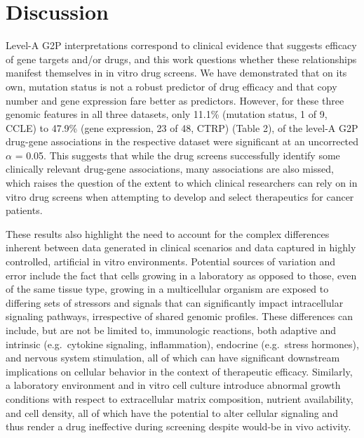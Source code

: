 \documentclass[man]{apa6}
\begin{document}
\section{Discussion}\label{discussion}

Level-A G2P interpretations correspond to clinical evidence that
suggests efficacy of gene targets and/or drugs, and this work questions
whether these relationships manifest themselves in in vitro drug
screens. We have demonstrated that on its own, mutation status is not a
robust predictor of drug efficacy and that copy number and gene
expression fare better as predictors. However, for these three genomic
features in all three datasets, only 11.1\% (mutation status, 1 of 9,
CCLE) to 47.9\% (gene expression, 23 of 48, CTRP) (Table 2), of the
level-A G2P drug-gene associations in the respective dataset were
significant at an uncorrected \(\alpha\) = 0.05. This suggests that
while the drug screens successfully identify some clinically relevant
drug-gene associations, many associations are also missed, which raises
the question of the extent to which clinical researchers can rely on in
vitro drug screens when attempting to develop and select therapeutics
for cancer patients.

These results also highlight the need to account for the complex
differences inherent between data generated in clinical scenarios and
data captured in highly controlled, artificial in vitro environments.
Potential sources of variation and error include the fact that cells
growing in a laboratory as opposed to those, even of the same tissue
type, growing in a multicellular organism are exposed to differing sets
of stressors and signals that can significantly impact intracellular
signaling pathways, irrespective of shared genomic profiles. These
differences can include, but are not be limited to, immunologic
reactions, both adaptive and intrinsic (e.g.~cytokine signaling,
inflammation), endocrine (e.g.~stress hormones), and nervous system
stimulation, all of which can have significant downstream implications
on cellular behavior in the context of therapeutic efficacy. Similarly,
a laboratory environment and in vitro cell culture introduce abnormal
growth conditions with respect to extracellular matrix composition,
nutrient availability, and cell density, all of which have the potential
to alter cellular signaling and thus render a drug ineffective during
screening despite would-be in vivo activity.
\end{document}
